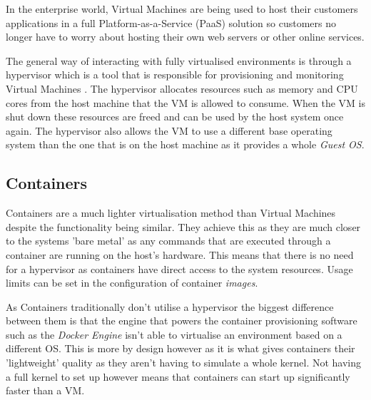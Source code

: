 In the enterprise world, Virtual Machines are being used to host their customers applications in a full Platform-as-a-Service (PaaS) solution so customers no longer have to worry about hosting their own web servers or other online services.

The general way of interacting with fully virtualised environments is through a hypervisor which is a tool that is responsible for provisioning and monitoring Virtual Machines \cite{hypervisor}. The hypervisor allocates resources such as memory and CPU cores from the host machine that the VM is allowed to consume. When the VM is shut down these resources are freed and can be used by the host system once again. The hypervisor also allows the VM to use a different base operating system than the one that is on the host machine as it provides a whole \textit{Guest OS}.

\subsection{Containers}

Containers are a much lighter virtualisation method than  Virtual Machines despite the functionality being similar. They achieve this as they are much closer to the systems 'bare metal' as any commands that are executed through a container are running on the host's hardware. This means that there is no need for a hypervisor as containers have direct access to the system resources. Usage limits can be set in the configuration of container \textit{images}.

As Containers traditionally don't utilise a hypervisor the biggest difference between them is that the engine that powers the container provisioning software such as the \textit{Docker Engine} isn't able to virtualise an environment based on a different OS. This is more by design however as it is what gives containers their 'lightweight' quality as they aren't having to simulate a whole kernel. Not having a full kernel to set up however means that containers can start up significantly faster than a VM.

